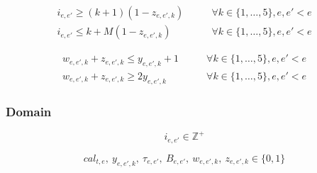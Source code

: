 \documentclass[11pt, a4paper, leqno]{article}
\begin{document}
	\begin{align*}
		i_{e,e'} \geq \left(k+1\right)\left(1-z_{e,e',k}\right) &\qquad\forall k \in \{1,\dots,5\},e,e'<e\\
		i_{e,e'} \leq k + M  (1-z_{e,e',k}) &\qquad\forall k \in \{1,\dots,5\},e,e'<e
	\end{align*}
	
	\begin{align*}
		w_{e,e',k} + z_{e,e',k} \leq y_{e,e',k} + 1 &\qquad\forall k \in \{1,\dots,5\},e,e'<e\\
		w_{e,e',k} + z_{e,e',k} \geq 2y_{e,e',k} &\qquad\forall k \in \{1,\dots,5\},e,e'<e
	\end{align*}
	
	\subsubsection{Domain}
	
	\[
		i_{e,e'} \in \mathbb{Z}^{+}
	\]
	
	\[
		cal_{t,e},\ y_{e,e',k},\ \tau_{e,e'},\ B_{e,e'},\ w_{e,e',k},\ z_{e,e',k} \in \{0,1\}
	\]
\end{document}
